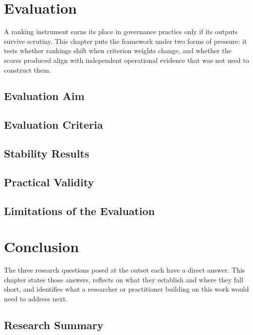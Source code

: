 \documentclass[
  12pt,
  letterpaper,
  12pt,
  oneside,
  english,
  onehalfspacing,
  headsepline]{MastersDoctoralThesis}
\begin{document}
\chapter{Evaluation}\label{sec-chapter5}

A ranking instrument earns its place in governance practice only if its
outputs survive scrutiny. This chapter puts the framework under two
forms of pressure: it tests whether rankings shift when criterion
weights change, and whether the scores produced align with independent
operational evidence that was not used to construct them.

\section{Evaluation Aim}\label{evaluation-aim}

\section{Evaluation Criteria}\label{evaluation-criteria}

\section{Stability Results}\label{stability-results}

\section{Practical Validity}\label{practical-validity}

\section{Limitations of the
Evaluation}\label{limitations-of-the-evaluation}


\chapter{Conclusion}\label{sec-chapter6}

The three research questions posed at the outset each have a direct
answer. This chapter states those answers, reflects on what they
establish and where they fall short, and identifies what a researcher or
practitioner building on this work would need to address next.

\section{Research Summary}\label{research-summary}
\end{document}
